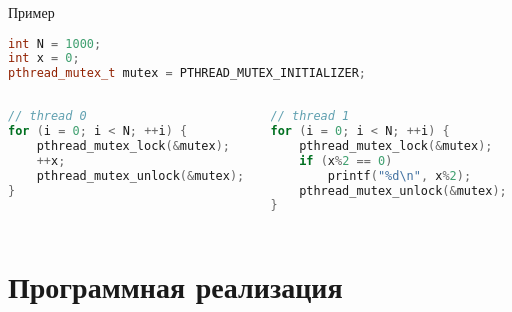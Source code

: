 \begin{frame}[fragile]{Пример}
\begin{lstlisting}[language=C++,basicstyle=\ttfamily,keywordstyle=\color{blue},basicstyle=\scriptsize]
int N = 1000;
int x = 0;
pthread_mutex_t mutex = PTHREAD_MUTEX_INITIALIZER;
\end{lstlisting}

\begin{columns}[t]
    \begin{column}[T]{0.5\textwidth}
    \begin{lstlisting}[language=C++,basicstyle=\ttfamily,keywordstyle=\color{blue},basicstyle=\scriptsize]
// thread 0
for (i = 0; i < N; ++i) {
    pthread_mutex_lock(&mutex);
    ++x;
    pthread_mutex_unlock(&mutex);
}
    \end{lstlisting}
    \end{column}
    \begin{column}[T]{0.5\textwidth}
    \begin{lstlisting}[language=C++,basicstyle=\ttfamily,keywordstyle=\color{blue},basicstyle=\scriptsize]
// thread 1
for (i = 0; i < N; ++i) {
    pthread_mutex_lock(&mutex);
    if (x%2 == 0)
        printf("%d\n", x%2);
    pthread_mutex_unlock(&mutex);
}
    \end{lstlisting}
    \end{column}
\end{columns}
\end{frame}

\section{Программная реализация}

